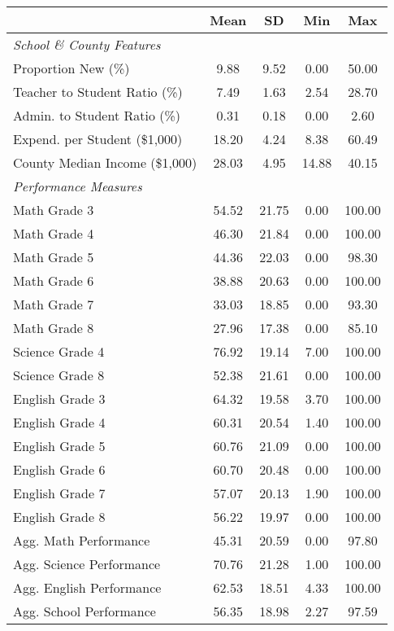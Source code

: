\begin{tabular}{l*{1}{cccc}}
\hline\hline

                    &  Mean&          SD&         Min&         Max\\
\hline
\textit{School \& County Features} \\
\hline
\rule{0pt}{4ex}Proportion New (\%)  &        9.88&        9.52&        0.00&       50.00\\
Teacher to Student Ratio (\%)&        7.49&        1.63&        2.54&       28.70\\
Admin. to Student Ratio (\%)&        0.31&        0.18&        0.00&        2.60\\
Expend. per Student (\$1,000)&       18.20&        4.24&        8.38&       60.49\\
County Median Income (\$1,000)&       28.03&        4.95&       14.88&       40.15\\
\hline
\textit{Performance Measures} \\
\hline
\rule{0pt}{4ex}Math Grade 3        &       54.52&       21.75&        0.00&      100.00\\
Math Grade 4        &       46.30&       21.84&        0.00&      100.00\\
Math Grade 5        &       44.36&       22.03&        0.00&       98.30\\
Math Grade 6        &       38.88&       20.63&        0.00&      100.00\\
Math Grade 7        &       33.03&       18.85&        0.00&       93.30\\
Math Grade 8        &       27.96&       17.38&        0.00&       85.10\\
Science Grade 4     &       76.92&       19.14&        7.00&      100.00\\
Science Grade 8     &       52.38&       21.61&        0.00&      100.00\\
English Grade 3     &       64.32&       19.58&        3.70&      100.00\\
English Grade 4     &       60.31&       20.54&        1.40&      100.00\\
English Grade 5     &       60.76&       21.09&        0.00&      100.00\\
English Grade 6     &       60.70&       20.48&        0.00&      100.00\\
English Grade 7     &       57.07&       20.13&        1.90&      100.00\\
English Grade 8     &       56.22&       19.97&        0.00&      100.00\\
Agg. Math Performance    &       45.31&       20.59&        0.00&       97.80\\
Agg. Science Performance &       70.76&       21.28&        1.00&      100.00\\
Agg. English Performance &       62.53&       18.51&        4.33&      100.00\\
Agg. School Performance&       56.35&       18.98&        2.27&       97.59\\
\hline\hline
\end{tabular}